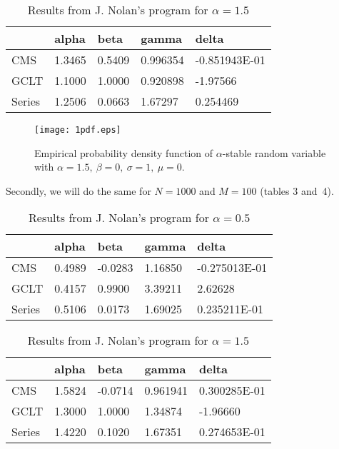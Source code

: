 \documentclass[12pt,titlepage]{article}
\begin{document}
\begin{table}[h]
\footnotesize
\centering
\caption{Results from J. Nolan's program for $\alpha=1.5$ }
\begin{tabular}{l|llll}
    & alpha  & beta   & gamma    & delta         \\ \hline
CMS & 1.3465  &  0.5409  &   0.996354   &  -0.851943E-01\\
GCLT &  1.1000  &  1.0000  &   0.920898     &    -1.97566 \\
Series &  1.2506  &  0.0663   &   1.67297     &    0.254469
\end{tabular}
\end{table}

\begin{figure}[ht]
	\centering
		\texttt{[image: 1pdf.eps]}
	\caption{\small Empirical probability density function
	of $\alpha$-stable random variable with $\alpha=1.5,\ \beta=0,\ \sigma=1,\ \mu=0$.
	}
\end{figure}

Secondly, we will do the same for $N=1000$ and $M=100$ (tables 3 and~4).


\begin{table}[h]
\footnotesize
\centering
\caption{Results from J. Nolan's program for $\alpha=0.5$ }
\begin{tabular}{l|llll}
     & alpha  & beta   & gamma    & delta         \\ \hline
CMS & 0.4989 &  -0.0283     & 1.16850       & -0.275013E-01 \\
GCLT &   0.4157   & 0.9900     & 3.39211         & 2.62628   \\
Series & 0.5106 &   0.0173 &     1.69025        & 0.235211E-01
\end{tabular}
\end{table}

\begin{table}[h]
\footnotesize
\centering
\caption{Results from J. Nolan's program for $\alpha=1.5$ }
\begin{tabular}{l|llll}
    & alpha  & beta   & gamma    & delta         \\ \hline
CMS & 1.5824  & -0.0714 &    0.961941        & 0.300285E-01\\
GCLT &   1.3000  &  1.0000     & 1.34874 &        -1.96660  \\
Series & 1.4220   & 0.1020     & 1.67351        & 0.274653E-01
\end{tabular}
\end{table}
\end{document}
